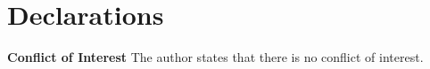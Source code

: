 \documentclass[12py]{amsart}%
\theoremstyle{definition}\newtheorem{definition}[thm]{Definition}
\theoremstyle{definition}
\begin{document}
\section{Declarations}

\textbf{Conflict of Interest} The author states that there is no conflict of interest.



\end{document}
